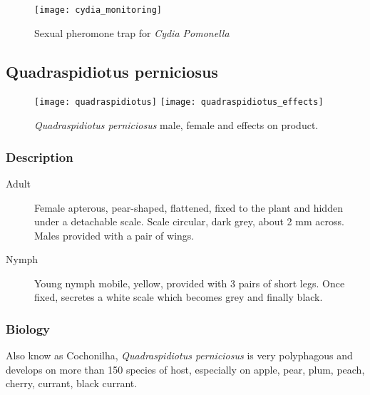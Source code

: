 \begin{figure}[htbp]
  \centering
  \texttt{[image: cydia\_monitoring]}
  \caption{Sexual pheromone trap for \textit{Cydia Pomonella}}
  \label{fig:cydia_monitoring}
\end{figure}

\subsection{Quadraspidiotus perniciosus}

\begin{figure}[htbp]
  \centering
    {\texttt{[image: quadraspidiotus]}}%
  \hfill
    {\texttt{[image: quadraspidiotus\_effects]}}%
  \caption{\textit{Quadraspidiotus perniciosus} male, female and effects on product.}
  \label{fig:quadraspidiotus_figs}
\end{figure}

\subsubsection{Description}

\begin{description}
	\item [Adult] Female apterous, pear-shaped, flattened, fixed to the plant and hidden under a detachable scale. Scale circular, dark grey, about 2 mm across. Males provided with a pair of wings.
	\item [Nymph] Young nymph mobile, yellow, provided with 3 pairs of short legs. Once fixed, secretes a white scale which becomes grey and finally black.
\end{description}

\subsubsection{Biology}

Also know as Cochonilha, \textit{Quadraspidiotus perniciosus} is very polyphagous and develops on more than 150 species of host, especially on apple, pear, plum, peach, cherry, currant, black currant.

